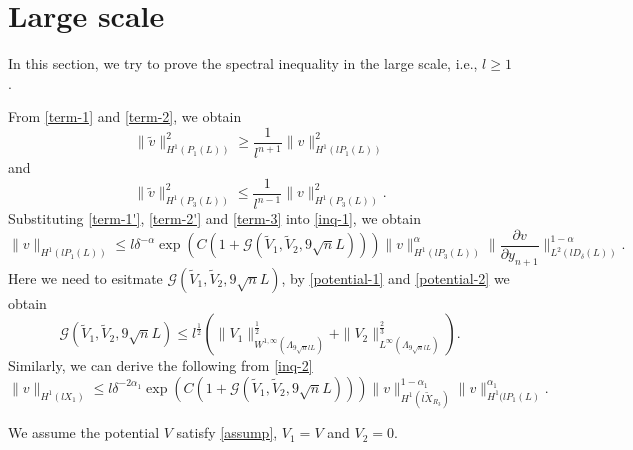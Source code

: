 \documentclass[12pt]{amsart}
\theoremstyle{definition}
\begin{document}
\section{Large scale}
In this section, we try to prove the spectral inequality in the large scale, i.e., $l\ge1$.

From \eqref{term-1} and \eqref{term-2}, we obtain
\begin{equation}\label{term-1'}
	\|\widetilde{v}\|^2_{H^{1}\left( P_1(L) \right) }\ge \frac{1}{l^{n+1}} \|v\|^2_{H^{1}\left( lP_1(L) \right) }
\end{equation}
and
\begin{equation}\label{term-2'}
	\|\widetilde{v}\|^2_{H^{1}(P_3(L))} \le  \frac{1}{l^{n-1}}\|v\|^2_{H^{1}(P_3(L))}.
\end{equation}
Substituting \eqref{term-1'}, \eqref{term-2'} and \eqref{term-3} into \eqref{inq-1}, we obtain
\begin{equation}\label{inq-1'}
	\|v\|_{H^{1}\left( lP_1(L) \right) }\le l  \delta^{-\alpha }\exp \left( C\left( 1+\mathcal{G}\left( \widetilde{V}_1,\widetilde{V}_2,9\sqrt{n} L \right)  \right)  \right) \|v\|^{\alpha }_{H^{1}\left( lP_3(L) \right) }\|\frac{\partial v}{\partial y_{n+1}}\|^{1-\alpha }_{L^2\left( lD_\delta(L) \right) }. 
\end{equation}
Here we need to esitmate $\mathcal{G}\left( \widetilde{V}_1,\widetilde{V}_2,9\sqrt{n} L \right) $, by \eqref{potential-1} and \eqref{potential-2} we obtain
\begin{equation}\label{potential'}
	\mathcal{G}\left( \widetilde{V}_1,\widetilde{V}_2,9\sqrt{n} L \right) \le l^{\frac{1}{2}} \left( \|V_1\|^{\frac{1}{2}}_{W^{1,\infty}\left( \Lambda_{9\sqrt{n} lL} \right) }+\|V_2\|^{\frac{2}{3}}_{L^{\infty}\left( \Lambda_{9\sqrt{n} lL} \right) } \right) . 
\end{equation}
Similarly, we can derive the following from \eqref{inq-2}
\begin{equation}\label{inq-2'}
	\|v\|_{H^{1}(lX_1)}\le l \delta^{-2\alpha_1}\exp\left( C\left( 1+\mathcal{G}\left( \widetilde{V}_1,\widetilde{V}_2,9\sqrt{n}L  \right)  \right)  \right) \|v\|^{1-\alpha_1}_{H^{1}\left( l\widetilde{X}_{R_3} \right) } \|v\|^{\alpha _1}_{H^{1}(lP_1(L)}.
\end{equation}

We assume the potential $V$ satisfy \eqref{assump},  $V_1=V$ and $V_2=0$.
\end{document}
